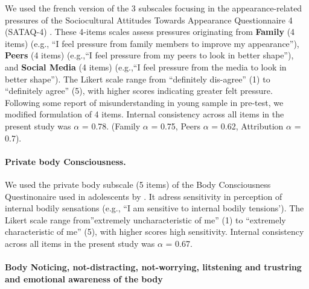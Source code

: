 \documentclass[preprint, 3p,
authoryear]{elsarticle} %
\begin{document}
We used the french version \citep{rodgers_psychometric_2016} of the 3
subscales focusing in the appearance-related pressures of the
Sociocultural Attitudes Towards Appearance Questionnaire 4 (SATAQ-4)
\citep{schaefer_development_2015}. These 4-items scales assess pressures
originating from \textbf{Family} (4 items) (e.g., ``I feel pressure from
family members to improve my appearance''), \textbf{Peers} (4 items)
(e.g.,``I feel pressure from my peers to look in better shape''), and
\textbf{Social Media} (4 items) (e.g.,``I feel pressure from the media
to look in better shape''). The Likert scale range from ``definitely
dis-agree'' (1) to ``definitely agree'' (5), with higher scores
indicating greater felt pressure. Following some report of
misunderstanding in young sample in pre-test, we modified formulation of
4 items. Internal consistency across all items in the present study was
\(\alpha\) = 0.78. (Family \(\alpha\) = 0.75, Peers \(\alpha\) = 0.62,
Attribution \(\alpha\) = 0.7).

\hypertarget{private-body-consciousness.}{%
\paragraph{Private body
Consciousness.}\label{private-body-consciousness.}}

We used the private body subscale (5 items) of the Body Consciousness
Questinonaire \citep{miller_consciousness_1981} used in adolescents by
\citet{black_gender_2010}. It adress sensitivity in perception of
internal bodily sensations (e.g., ``I am sensitive to internal bodily
tensions'). The Likert scale range from''extremely uncharacteristic of
me'' (1) to ``extremely characteristic of me'' (5), with higher scores
high sensitivity. Internal consistency across all items in the present
study was \(\alpha\) = 0.67.

\hypertarget{body-noticing-not-distracting-not-worrying-litstening-and-trustring-and-emotional-awareness-of-the-body}{%
\paragraph{Body Noticing, not-distracting, not-worrying, litstening and
trustring and emotional awareness of the
body}\label{body-noticing-not-distracting-not-worrying-litstening-and-trustring-and-emotional-awareness-of-the-body}}
\end{document}
